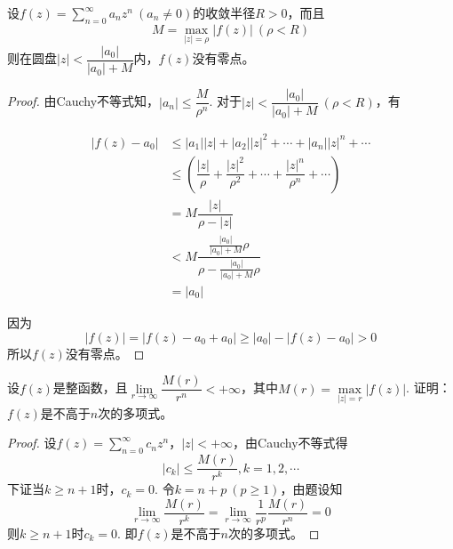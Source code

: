 \begin{proposition}

    设$f(z) = \sum\limits_{n = 0}^{\infty}{a_n z^n} \ (a_n \neq 0)$的收敛半径$R > 0$，而且
    \[M = \max_{|z| = \rho}{|f(z)|}\ (\rho < R)\]
    则在圆盘$|z| < \dfrac{|a_0|}{|a_0| + M}$内，$f(z)$没有零点。

\end{proposition}

\begin{proof}

    由\textup{Cauchy}不等式知，$|a_n| \leq \dfrac{M}{\rho^n}$. 对于$|z| < \dfrac{|a_0|}{|a_0| + M}\ (\rho < R)$，有

    \begin{align*}
        |f(z) - a_0| & \leq |a_1||z| + |a_2||z|^2 + \cdots + |a_n||z|^n + \cdots \\
        & \leq \left( \dfrac{|z|}{\rho} + \dfrac{|z|^2}{\rho^2} + \cdots + \dfrac{|z|^n}{\rho^n} + \cdots \right) \\
        & = M \dfrac{|z|}{\rho - |z|} \\
        & < M \dfrac{\frac{|a_0|}{|a_0| + M}\rho}{\rho - \frac{|a_0|}{|a_0| + M}\rho} \\
        & = |a_0|
    \end{align*}

    因为
    \[|f(z)| = |f(z) - a_0 + a_0| \geq |a_0| - |f(z) - a_0| > 0\]
    所以$f(z)$没有零点。

\end{proof}

\begin{proposition}

    设$f(z)$是整函数，且$\lim\limits_{r \to \infty}{\dfrac{M(r)}{r^n}} < +\infty$，其中$M(r) = \max\limits_{|z| = r}{|f(z)|}$. 证明：$f(z)$是不高于$n$次的多项式。

\end{proposition}

\begin{proof}

    设$f(z) = \sum\limits_{n = 0}^{\infty}{c_n z^n}$，$|z| < + \infty$，由\textup{Cauchy}不等式得
    \[|c_k| \leq \dfrac{M(r)}{r^k}, k = 1, 2, \cdots\]
    下证当$k \geq n + 1$时，$c_k = 0$. 令$k = n + p \ (p \geq 1)$，由题设知
    \[\lim\limits_{r \to \infty}{\dfrac{M(r)}{r^k}} = \lim\limits_{r \to \infty}{\dfrac{1}{r^p} \dfrac{M(r)}{r^n}} = 0\]
    则$k \geq n + 1$时$c_k = 0$. 即$f(z)$是不高于$n$次的多项式。

\end{proof}

